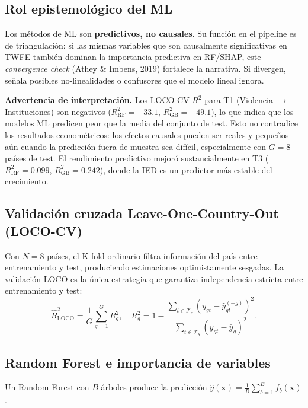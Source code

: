 \documentclass[12pt, a4paper]{article}
\theoremstyle{definition}
\begin{document}
\subsection{Rol epistemológico del ML}

Los métodos de ML son \textbf{predictivos, no causales}. Su función en el pipeline es de triangulación: si las mismas variables que son causalmente significativas en TWFE también dominan la importancia predictiva en RF/SHAP, este \textit{convergence check} (Athey \& Imbens, 2019) fortalece la narrativa. Si divergen, señala posibles no-linealidades o confusores que el modelo lineal ignora.

\begin{warningbox}
\textbf{Advertencia de interpretación.} Los LOCO-CV $R^2$ para T1 (Violencia $\to$ Instituciones) son negativos ($R^2_{\text{RF}} = -33.1$, $R^2_{\text{GB}} = -49.1$), lo que indica que los modelos ML predicen peor que la media del conjunto de test. Esto no contradice los resultados econométricos: los efectos causales pueden ser reales y pequeños aún cuando la predicción fuera de muestra sea difícil, especialmente con $G = 8$ países de test. El rendimiento predictivo mejoró sustancialmente en T3 ($R^2_{\text{RF}} = 0.099$, $R^2_{\text{GB}} = 0.242$), donde la IED es un predictor más estable del crecimiento.
\end{warningbox}

\subsection{Validación cruzada Leave-One-Country-Out (LOCO-CV)}

Con $N=8$ países, el K-fold ordinario filtra información del país entre entrenamiento y test, produciendo estimaciones optimistamente sesgadas. La validación LOCO es la única estrategia que garantiza independencia estricta entre entrenamiento y test:
\[
  \hat{R}^2_{\text{LOCO}} = \frac{1}{G}\sum_{g=1}^{G} R^2_g, \quad
  R^2_g = 1 - \frac{\sum_{t\in\mathcal{T}_g}(y_{gt} - \hat{y}^{(-g)}_{gt})^2}{\sum_{t\in\mathcal{T}_g}(y_{gt} - \bar{y}_g)^2}.
\]

\subsection{Random Forest e importancia de variables}

Un Random Forest con $B$ árboles produce la predicción $\hat{y}(\bm{x}) = \frac{1}{B}\sum_{b=1}^{B} f_b(\bm{x})$.
\end{document}
